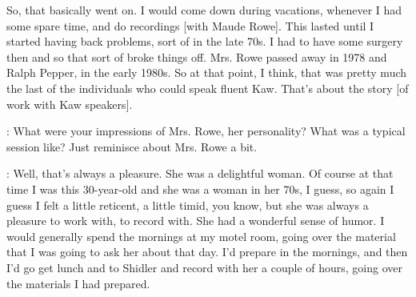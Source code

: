 \documentclass[output=paper]{LSP/langsci}
\begin{document}
So, that basically went on. I would come down during vacations, whenever I had some spare time, and do recordings [with Maude Rowe]. This lasted until I started having back problems, sort of in the late 70s. I had to have some surgery then and so that sort of broke things off. Mrs. Rowe passed away in 1978 and Ralph Pepper, in the early 1980s. So at that point, I think, that was pretty much the last of the individuals who could speak fluent Kaw. That's about the story [of work with Kaw speakers].

:  What were your impressions of Mrs. Rowe, her personality? What was a typical session like? Just reminisce about Mrs. Rowe a bit.

:  Well, that's always a pleasure. She was a delightful woman. Of course at that time I was this 30-year-old and she was a woman in her 70s, I guess, so again I guess I felt a little reticent, a little timid, you know, but she was always a pleasure to work with, to record with. She had a wonderful sense of humor. I would generally spend the mornings at my motel room, going over the material that I was going to ask her about that day. I'd prepare in the mornings, and then I'd go get lunch and to Shidler and record with her a couple of hours, going over the materials I had prepared. 
\end{document}
